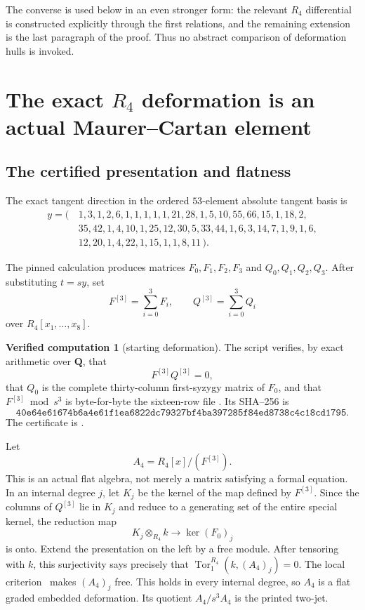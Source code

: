 \documentclass[11pt]{article}
\theoremstyle{definition}
\newtheorem{computation}[theorem]{Verified computation}
\theoremstyle{remark}
\newcommand{\QQ}{\mathbf Q}
\newcommand{\Tor}{\operatorname{Tor}}
\begin{document}
The converse is used below in an even stronger form: the relevant
$R_4$ differential is constructed explicitly through the first relations,
and the remaining extension is the last paragraph of the proof.  Thus no
abstract comparison of deformation hulls is invoked.

\section{The exact \texorpdfstring{$R_4$}{R4} deformation is an actual
Maurer--Cartan element}

\subsection{The certified presentation and flatness}

The exact tangent direction in the ordered $53$-element absolute tangent
basis is
\[
\begin{split}
y=(\,&1,3,1,2,6,1,1,1,1,1,21,28,1,5,10,55,66,15,1,18,2,\\
&35,42,1,4,10,1,25,12,30,5,33,44,1,6,3,14,7,1,9,1,6,\\
&12,20,1,4,22,1,15,1,1,8,11\,).
\end{split}                                                    \tag{3.1}
\]

The pinned calculation produces matrices $F_0,F_1,F_2,F_3$ and
$Q_0,Q_1,Q_2,Q_3$.  After substituting $t=sy$, set
\[
 F^{[3]}=\sum_{i=0}^3F_i,
 \qquad Q^{[3]}=\sum_{i=0}^3Q_i
\]
over $R_4[x_1,\ldots,x_8]$.

\begin{computation}[starting deformation]\label{comp:start}
The script  verifies, by exact
arithmetic over $\QQ$, that
\[
 F^{[3]}Q^{[3]}=0,                                           \tag{3.2}
\]
that $Q_0$ is the complete thirty-column first-syzygy matrix of $F_0$, and
that $F^{[3]}\bmod s^3$ is byte-for-byte the sixteen-row file
.  Its SHA--256 is
\[
\texttt{40e64e61674b6a4e61f1ea6822dc79327bf4ba397285f84ed8738c4c18cd1795}.
\tag{3.3}
\]
The certificate is .
\end{computation}

Let
\[
 A_4=R_4[x]/(F^{[3]}).
\]
This is an actual flat algebra, not merely a matrix satisfying a formal
equation.  In an internal degree $j$, let $K_j$ be the kernel of the map
defined by $F^{[3]}$.  Since the columns of $Q^{[3]}$ lie in $K_j$ and reduce
to a generating set of the entire special kernel, the reduction map
\[
 K_j\otimes_{R_4}k\longrightarrow\ker(F_0)_j
\]
is onto.  Extend the presentation on the left by a free module.  After
tensoring with $k$, this surjectivity says precisely that
\(
 \Tor^{R_4}_1(k,(A_4)_j)=0.
\)
The local criterion~\cite[Tag 00MK]{StacksFlat} makes $(A_4)_j$ free.  This
holds in every internal degree, so $A_4$ is a flat graded embedded
deformation.  Its quotient $A_4/s^3A_4$ is the printed two-jet.
\end{document}
